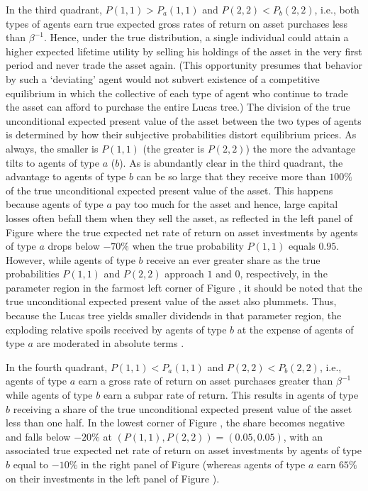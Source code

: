 In the third quadrant, $P(1,1)>P_a(1,1)$ and 
$P(2,2)<P_b(2,2)$, i.e., both types of agents
earn true expected gross rates of return on asset 
purchases less than $\beta^{-1}$. 
Hence, under the true
distribution,  a single individual could attain a
higher expected lifetime utility by selling his  holdings of the asset
in the very first period and never trade the asset again.
(This opportunity presumes  that behavior by  such a `deviating' 
agent would  not subvert  existence of a 
competitive equilibrium in which 
the collective of each type of agent
who continue 
to trade the asset 
can afford to purchase the entire Lucas tree.)
The division of the true unconditional expected 
present value of the asset between the two types
of agents is determined by how their subjective
probabilities distort equilibrium prices.
As always, the smaller is $P(1,1)$ (the greater is
$P(2,2)$) the more the advantage  tilts to agents 
of type $a$ ($b$). As is abundantly clear 
in the third quadrant, the advantage to agents 
of type $b$ can be so large that they receive 
more than $100\%$ of the true unconditional 
expected present value of the asset.
This happens because agents of type $a$ 
pay too much for  the 
asset and hence, large capital losses 
often befall them when they sell the
asset, as reflected in the left panel of
Figure  where the true expected net 
rate of return on asset investments by agents 
of type $a$ drops below $-70\%$ when the true 
probability $P(1,1)$ equals $0.95$. However, 
while agents of type $b$ receive an ever greater 
share as the true probabilities $P(1,1)$ and 
$P(2,2)$ approach $1$ and $0$, respectively,  
in the parameter region in 
the farmost left corner of Figure ,
it should be noted that the true unconditional
expected present value of the asset  also plummets. Thus, because
 the Lucas tree yields
smaller dividends in that parameter region, the exploding 
relative spoils received by agents of type $b$ 
at the expense of agents of type $a$ are moderated
in absolute terms .

In the fourth quadrant, $P(1,1)<P_a(1,1)$ and 
$P(2,2)<P_b(2,2)$, i.e., agents of type $a$ earn 
a gross rate of return on asset purchases greater 
than $\beta^{-1}$ while agents of type $b$ earn a 
subpar rate of return. This results in agents of 
type $b$ receiving a share of the true unconditional 
expected present value of the asset less than one 
half. In the lowest corner of Figure ,
the share becomes negative and falls below 
$-20\%$ at $(P(1,1),P(2,2))=(0.05,0.05)$, with an  
associated true expected net rate of return on asset 
investments by agents of type $b$ equal to $-10\%$ in 
the right panel of Figure  (whereas
agents of type $a$ earn $65\%$ on their
investments in the left panel of Figure ).


